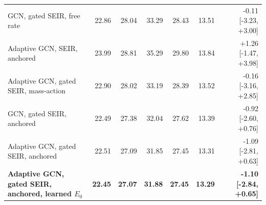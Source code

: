 \begin{table}[t]
\begin{tabular}{@{}p{2.85in}rrrrrr@{}}
GCN, gated SEIR, free rate & 22.86 & 28.04 & 33.29 & 28.43 & 13.51 & -0.11 [-3.23, +3.00] \\ %

Adaptive GCN, SEIR, anchored & 23.99 & 28.81 & 35.29 & 29.80 & 13.84 & +1.26 [-1.47, +3.98] \\ %

Adaptive GCN, gated SEIR, mass-action & 22.90 & 28.02 & 33.19 & 28.39 & 13.52 & -0.16 [-3.16, +2.85] \\ %

GCN, gated SEIR, anchored & 22.49 & 27.38 & 32.04 & 27.62 & 13.39 & -0.92 [-2.60, +0.76] \\ %

Adaptive GCN, gated SEIR, anchored & 22.51 & 27.09 & 31.85 & 27.45 & 13.31 & -1.09 [-2.81, +0.63] \\ %

\textbf{Adaptive GCN, gated SEIR, anchored, learned $E_0$} & \textbf{22.45} & \textbf{27.07} & \textbf{31.88} & \textbf{27.45} & \textbf{13.29} & \textbf{-1.10 [-2.84, +0.65]} \\ %

\bottomrule
\end{tabular}
\end{table}
